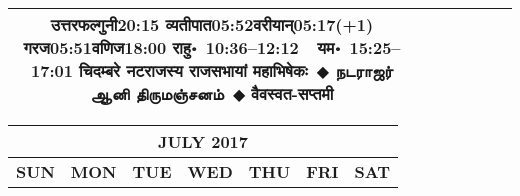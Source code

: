 \documentclass[a3paper,12pt,landscape]{article}
\newcommand{\eventsep}{~$\Diamondblack$ }
\newcommand{\To}{\hspace{1pt}\raisebox{0pt}{\tiny\RIGHTarrow}\hspace{1pt}}
\newcommand{\tamil}[1]{%
{\fontspec[Scale=0.9,FakeStretch=0.9]{Noto Sans Tamil} \footnotesize #1}}
\newcommand{\rahuyama}[2]{%
{राहु॰~\textsf{#1}~~यम॰~\textsf{#2}}
}
\begin{document}
\begin{center}
\begin{tabular}{|c|c|c|c|c|c|c|}
{{\mbox{उत्तरफल्गुनी\To{}\textsf{20:15\hspace{2ex}}}}%
{\mbox{व्यतीपात\To{}\textsf{05:52\hspace{2ex}}}\mbox{वरीयान्\To{}\textsf{05:17(+1)\hspace{2ex}}}}%
{\mbox{गरज\To{}\textsf{05:51\hspace{2ex}}}\mbox{वणिज\To{}\textsf{18:00\hspace{2ex}}}}}%
{\rahuyama{10:36--12:12}{15:25--17:01}}%
{चिदम्बरे नटराजस्य राजसभायां महाभिषेकः\eventsep \tamil{நடராஜர் ஆனி திருமஞ்சனம்}\eventsep वैवस्वत-सप्तमी}
&
\\ \hline
\end{tabular}



\begin{tabular}{|c|c|c|c|c|c|c|}
\multicolumn{7}{c}{\Large \bfseries \sffamily JULY 2017}\\[3mm]
\hline
\textbf{\textsf{SUN}} & \textbf{\textsf{MON}} & \textbf{\textsf{TUE}} & \textbf{\textsf{WED}} & \textbf{\textsf{THU}} & \textbf{\textsf{FRI}} & \textbf{\textsf{SAT}} \\ \hline


\end{tabular}
\end{center}
\end{document}
